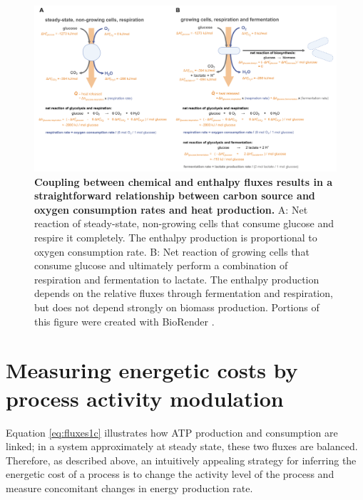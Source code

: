 \documentclass{compactarticle}
\begin{document}
\begin{figure}[!htpb]
    \centering
    \includegraphics[width=\textwidth]{fig/fig3.pdf}
    \caption{\textbf{Coupling between chemical and enthalpy fluxes results in a straightforward relationship between carbon source and oxygen consumption rates and heat production.} A: Net reaction of steady-state, non-growing cells that consume glucose and respire it completely. The enthalpy production is proportional to oxygen consumption rate. B: Net reaction of growing cells that consume glucose and ultimately perform a combination of respiration and fermentation to lactate. The enthalpy production depends on the relative fluxes through fermentation and respiration, but does not depend strongly on biomass production. Portions of this figure were created with BioRender \cite{biorender}.}
    \label{fig:enthalpy}
\end{figure}


\section{Measuring energetic costs by process activity modulation}
\label{sec:complications}

Equation \ref{eq:fluxes1c} illustrates how ATP production and consumption are linked; in a system approximately at steady state, these two fluxes are balanced. Therefore, as described above, an intuitively appealing strategy for inferring the energetic cost of a process is to change the activity level of the process and measure concomitant changes in energy production rate.
\end{document}
